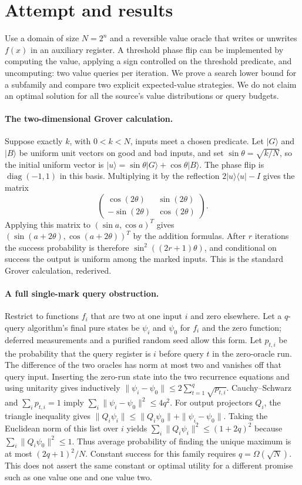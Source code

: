\documentclass[11pt]{article}
\begin{document}
\section{Attempt and results}
Use a domain of size $N=2^n$ and a reversible value oracle that writes or
unwrites $f(x)$ in an auxiliary register. A threshold phase flip can be
implemented by computing the value, applying a sign controlled on the
threshold predicate, and uncomputing: two value queries per iteration.
We prove a search lower bound for a subfamily and compare two explicit
expected-value strategies. We do not claim an optimal solution for all the
source's value distributions or query budgets.

\paragraph{The two-dimensional Grover calculation.}
Suppose exactly $k$, with $0<k<N$, inputs meet a chosen predicate. Let
$|G\rangle$ and $|B\rangle$ be uniform unit vectors on good and bad inputs,
and set $\sin\theta=\sqrt{k/N}$, so the initial uniform vector is
$|u\rangle=\sin\theta|G\rangle+\cos\theta|B\rangle$.
The phase flip is $\operatorname{diag}(-1,1)$ in this basis. Multiplying it
by the reflection $2|u\rangle\langle u|-I$ gives the matrix
\[
\begin{pmatrix}\cos(2\theta)&\sin(2\theta)\\
-\sin(2\theta)&\cos(2\theta)\end{pmatrix}.
\]
Applying this matrix to $(\sin a,\cos a)^T$ gives
$(\sin(a+2\theta),\cos(a+2\theta))^T$ by the addition formulas.
After $r$ iterations the success probability is therefore
$\sin^2((2r+1)\theta)$, and conditional on success the output is uniform
among the marked inputs. This is the standard Grover calculation, rederived.

\paragraph{A full single-mark query obstruction.}
Restrict to functions $f_i$ that are two at one input $i$ and zero elsewhere.
Let a $q$-query algorithm's final pure states be $\psi_i$ and $\psi_0$ for
$f_i$ and the zero function; deferred measurements and a purified random
seed allow this form. Let $p_{t,i}$ be the probability that the query register
is $i$ before query $t$ in the zero-oracle run. The difference of the two
oracles has norm at most two and vanishes off that query input.
Inserting the zero-run state into the two recurrence equations and using
unitarity gives inductively
$\|\psi_i-\psi_0\|\le2\sum_{t=1}^q\sqrt{p_{t,i}}$.
Cauchy--Schwarz and $\sum_i p_{t,i}=1$ imply
$\sum_i\|\psi_i-\psi_0\|^2\le4q^2$.
For output projectors $Q_i$, the triangle inequality gives
$\|Q_i\psi_i\|\le\|Q_i\psi_0\|+\|\psi_i-\psi_0\|$.
Taking the Euclidean norm of this list over $i$ yields
$\sum_i\|Q_i\psi_i\|^2\le(1+2q)^2$ because
$\sum_i\|Q_i\psi_0\|^2\le1$. Thus average probability of finding the
unique maximum is at most $(2q+1)^2/N$. Constant success for this family
requires $q=\Omega(\sqrt N)$. This does not assert the same constant or
optimal utility for a different promise such as one value one and one value two.
\end{document}
